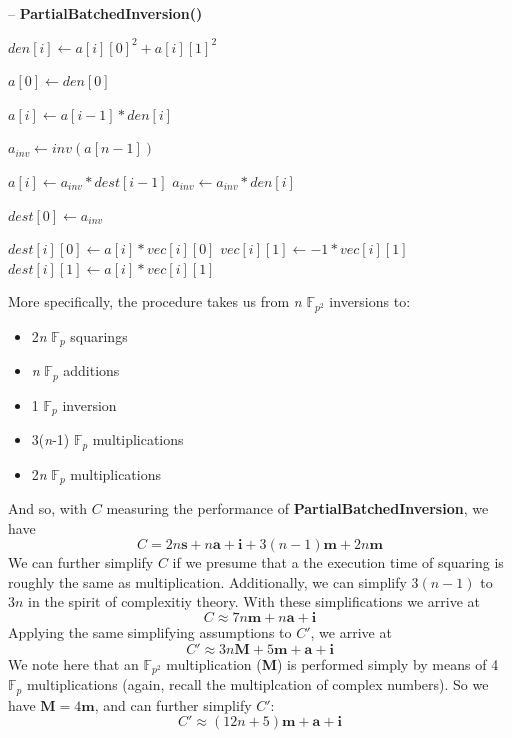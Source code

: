 \begin{algorithm}
\caption{-- \textbf{PartialBatchedInversion()}}\label{alg:pbinvmath}
\begin{algorithmic}[1]
	\State $den[i] \gets a[i][0]^{2} + a[i][1]^{2}$
\EndFor

\State $a[0] \gets den[0]$

	\State $a[i] \gets a[i-1]*den[i]$
\EndFor

\State $a_{inv} \gets inv(a[n-1])$

	\State $a[i] \gets a_{inv}*dest[i-1]$
	\State $a_{inv} \gets a_{inv}*den[i]$
\EndFor

\State $dest[0] \gets a_{inv}$

	\State $dest[i][0] \gets a[i]*vec[i][0]$
	\State $vec[i][1] \gets -1*vec[i][1]$
	\State $dest[i][1] \gets a[i]*vec[i][1]$
\EndFor
\EndProcedure
\end{algorithmic}
\end{algorithm}
\noindent
More specifically, the procedure takes us from \textit{n} $\mathbb{F}_{p^{2}}$  inversions to: 
\begin{center}
\begin{itemize}
\item 2\textit{n} $\mathbb{F}_{p}$ squarings
\item \textit{n} $\mathbb{F}_{p}$ additions
\item 1 $\mathbb{F}_{p}$ inversion
\item 3(\textit{n}-1) $\mathbb{F}_{p}$ multiplications
\item 2\textit{n} $\mathbb{F}_{p}$ multiplications
\end{itemize}
\end{center}
\noindent
And so, with $C$ measuring the performance of \textbf{PartialBatchedInversion}, we have
$$
C = 2n\textbf{s} + n\textbf{a} + \textbf{i} + 3(n-1)\textbf{m} + 2n\textbf{m}
$$
We can further simplify $C$ if we presume that a the execution time of squaring is roughly the same as multiplication. Additionally, we can simplify $3(n-1)$ to $3n$ in the spirit of complexitiy theory. With these simplifications we arrive at
$$
C \approx 7n\textbf{m} + n\textbf{a} + \textbf{i}
$$
Applying the same simplifying assumptions to $C'$, we arrive at
$$
C' \approx 3n\textbf{M} + 5\textbf{m} + \textbf{a} + \textbf{i} 
$$
We note here that an $\mathbb{F}_{p^2}$ multiplication (\textbf{M}) is performed simply by means of 4 $\mathbb{F}_{p}$ multiplications (again, recall the multiplcation of complex numbers). So we have $\textbf{M} = 4\textbf{m}$, and can further simplify $C'$:
$$
C' \approx (12n + 5)\textbf{m} + \textbf{a} + \textbf{i}
$$

